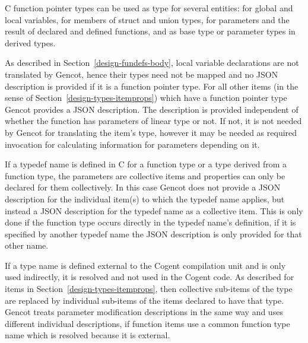 C function pointer types can be used as type for several entities: for global and local variables, for members of struct
and union types, for parameters and the result of declared and defined functions, and as base type or parameter 
types in derived types.

As described in Section~\ref{design-fundefs-body}, local variable declarations are not translated by Gencot, hence
their types need not be mapped and no JSON description is provided if it is a function pointer type. 
For all other items (in the sense of Section~\ref{design-types-itemprops}) which have a function pointer type Gencot 
provides a JSON description. The
description is provided independent of whether the function has parameters of linear type or not. If not, it is
not needed by Gencot for translating the item's type, however it may be needed as required invocation for
calculating information for parameters depending on it.

If a typedef name is defined in C for a function type or a type derived from a function type, the parameters are collective items
and properties can only be declared for them collectively. In this case Gencot does not provide a JSON description for the individual
item(s) to which the typedef name applies, but instead a JSON description for the typedef name as a collective item. This 
is only done if the function type occurs directly in the typedef name's definition, if it is specified by another typedef
name the JSON description is only provided for that other name.

If a type name is defined external to the Cogent compilation unit and is only used indirectly, it is resolved and not 
used in the Cogent code. As described for items in Section~\ref{design-types-itemprops}, then collective sub-items of the
type are replaced by individual sub-items of the items declared to have that type. Gencot treats parameter modification 
descriptions in the same way and uses different individual descriptions, if function items use a common function type name which 
is resolved because it is external.
